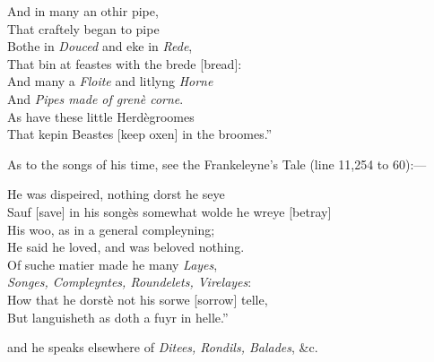 \begin{scverse}
And in many an othir pipe,\\
That craftely began to pipe\\
Bothe in \textit{Douced} and eke in \textit{Rede},\footnotemark\\
That bin at feastes with the brede [bread]:\\
And many a \textit{Floite} and litlyng \textit{Horne}\\
And \textit{Pipes made of grenè corne}.\\
As have these little Herdègroomes\\
That kepin Beastes [keep oxen] in the broomes.”
\end{scverse}


As to the songs of his time, see the Frankeleyne’s Tale (line 11,254 to 60):—
\begin{scverse}
He was dispeired, nothing dorst he seye\\
Sauf [save] in his songès somewhat wolde he wreye [betray]\\
His woo, as in a general compleyning;\\
He said he loved, and was beloved nothing.\\
Of suche matier made he many \textit{Layes},\\
\textit{Songes, Compleyntes, Roundelets, Virelayes}:\\
How that he dorstè not his sorwe [sorrow] telle,\\
But languisheth as doth a fuyr in helle.”
\end{scverse}
and he speaks elsewhere of \textit{Ditees, Rondils, Balades}, \&c.

